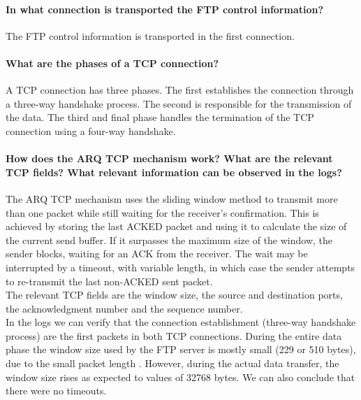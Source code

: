 \documentclass[11pt]{report}
\begin{document}
\paragraph{In what connection is transported the FTP control information?}
The FTP control information is transported in the first connection.

\paragraph{What are the phases of a TCP connection?}
A TCP connection has three phases. The first establishes the connection through
a three-way handshake process. The second is responsible for the transmission
of the data. The third and final phase handles the termination of the
TCP connection using a four-way handshake.

\paragraph{How does the ARQ TCP mechanism work? What are the relevant TCP fields?
What relevant information can be observed in the logs?}
The ARQ TCP mechanism uses the sliding window method to transmit more than one
packet while still waiting for the receiver's confirmation. This is achieved
by storing the last ACKED packet and using it to calculate the size of the
current send buffer. If it surpasses the maximum size of the window,
the sender blocks, waiting for an ACK from the receiver. The wait may be
interrupted by a timeout, with variable length, in which case the sender
attempts to re-transmit the last non-ACKED sent packet.\\
The relevant TCP fields are the window size, the source and destination ports,
the acknowledgment number and the sequence number.\\
In the logs we can verify that the connection establishment (three-way
handshake process) are the first packets in both TCP connections. During
the entire data phase the window size used by the FTP server is mostly
small (229 or 510 bytes), due to the small packet length . However,
during the actual data transfer, the window size rises as expected
to values of 32768 bytes. We can also conclude that there were no timeouts.
\end{document}

